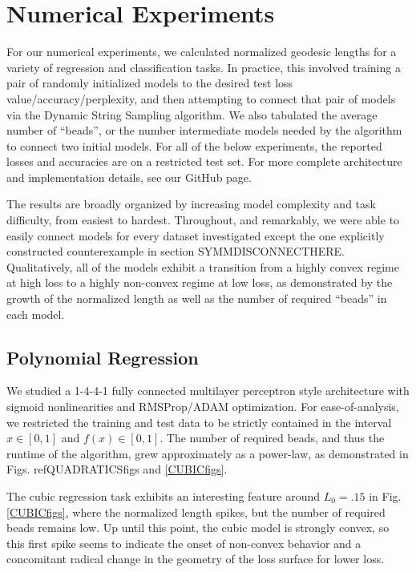 \section{Numerical Experiments}
\label{sec:NumExp}

For our numerical experiments, we calculated normalized geodesic lengths for a variety of regression and classification tasks.  In practice, this involved training a pair of randomly initialized models to the desired test loss value/accuracy/perplexity, and then attempting to connect that pair of models via the Dynamic String Sampling algorithm.  We also tabulated the average number of ``beads'', or the number intermediate models needed by the algorithm to connect two initial models.  For all of the below experiments, the reported losses and accuracies are on a restricted test set.  For more complete architecture and implementation details, see our GitHub page.

The results are broadly organized by increasing model complexity and task difficulty, from easiest to hardest.  Throughout, and remarkably, we were able to easily connect models for every dataset investigated except the one explicitly constructed counterexample in section SYMMDISCONNECTHERE.  Qualitatively, all of the models exhibit a transition from a highly convex regime at high loss to a highly non-convex regime at low loss, as demonstrated by the growth of the normalized length as well as the number of required ``beads'' in each model.


\subsection{Polynomial Regression}
\label{sec:PolyFuncs}

 We studied a 1-4-4-1 fully connected multilayer perceptron style architecture with sigmoid nonlinearities and RMSProp/ADAM optimization.  For ease-of-analysis, we restricted the training and test data to be strictly contained in the interval $x\in[0,1]$ and $f(x)\in[0,1]$.  The number of required beads, and thus the runtime of the algorithm, grew approximately as a power-law, as demonstrated in Figs. ref{QUADRATICSfigs} and \ref{CUBICfigs}.
 
 The cubic regression task exhibits an interesting feature around $L_0=.15$ in Fig. \ref{CUBICfigs}, where the normalized length spikes, but the number of required beads remains low.  Up until this point, the cubic model is strongly convex, so this first spike seems to indicate the onset of non-convex behavior and a concomitant radical change in the geometry of the loss surface for lower loss.
 

